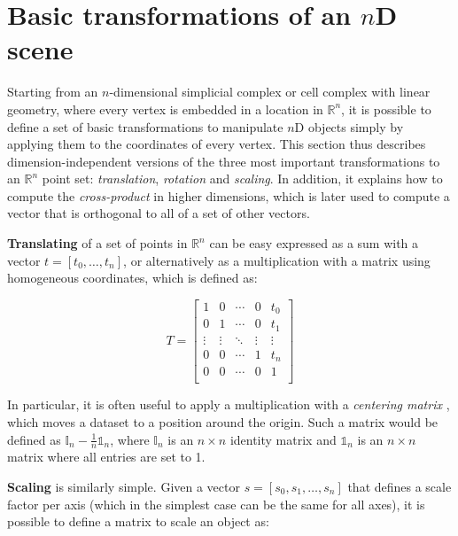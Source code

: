 \section{Basic transformations of an $n$D scene}
\label{se:ndmath}

Starting from an $n$-dimensional simplicial complex or cell complex with linear geometry, where every vertex is embedded in a location in $\mathbb{R}^n$, it is possible to define a set of basic transformations to manipulate $n$D objects simply by applying them to the coordinates of every vertex.
This section thus describes dimension-independent versions of the three most important transformations to an $\mathbb{R}^n$ point set: \emph{translation}, \emph{rotation} and \emph{scaling}.
In addition, it explains how to compute the \emph{cross-product} in higher dimensions, which is later used to compute a vector that is orthogonal to all of a set of other vectors.

\textbf{Translating} of a set of points in $\mathbb{R}^n$ can be easy expressed as a sum with a vector $t = \left[t_0, \ldots, t_n\right]$, or alternatively as a multiplication with a matrix using homogeneous coordinates, which is defined as:

\begin{equation*}
T = \begin{bmatrix}
1 & 0 & \cdots & 0 & t_0 \\
0 & 1 & \cdots & 0 & t_1 \\
\vdots & \vdots & \ddots & \vdots & \vdots \\
0 & 0 & \cdots & 1 & t_n \\
0 & 0 & \cdots & 0 & 1 \\
\end{bmatrix}
\end{equation*}

In particular, it is often useful to apply a multiplication with a \emph{centering matrix} \citep[\S{}3.2]{Marden96}, which  moves a dataset to a position around the origin.
Such a matrix would be defined as $\mathbb{I}_n - \frac{1}{n}\mathbb{1}_n$, where $\mathbb{I}_n$ is an $n \times n$ identity matrix and $\mathbb{1}_n$ is an $n \times n$ matrix where all entries are set to 1.

\textbf{Scaling} is similarly simple.
Given a vector $s = \left[ s_0, s_1, \ldots, s_n \right]$ that defines a scale factor per axis (which in the simplest case can be the same for all axes), it is possible to define a matrix to scale an object as:

